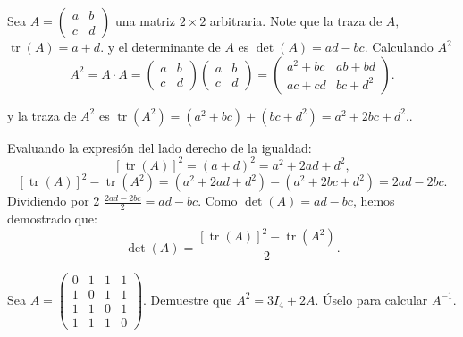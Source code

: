\begin{myproof}
Sea \(A = \begin{pmatrix} a & b \\ c & d \end{pmatrix}\) una matriz \(2 \times 2\) arbitraria. Note que la traza de $A,$ \(
\operatorname{tr}(A) = a + d.
\) y el determinante de $A$ es \(
\det(A) = ad - bc.\) Calculando $A^2$
\[
A^2 = A \cdot A = \begin{pmatrix} a & b \\ c & d \end{pmatrix} \begin{pmatrix} a & b \\ c & d \end{pmatrix} = \begin{pmatrix} a^2 + bc & ab + bd \\ ac + cd & bc + d^2 \end{pmatrix}.
\]

 y la traza de $A^2$ es \(
\operatorname{tr}(A^2) = (a^2 + bc) + (bc + d^2) = a^2 + 2bc + d^2.
.\)

Evaluando la expresión del lado derecho de la igualdad:
\[
[\operatorname{tr}(A)]^2 = (a + d)^2 = a^2 + 2ad + d^2,
\]
\[
[\operatorname{tr}(A)]^2 - \operatorname{tr}(A^2) = (a^2 + 2ad + d^2) - (a^2 + 2bc + d^2) = 2ad - 2bc.
\]
Dividiendo por 2 \(
\frac{2ad - 2bc}{2} = ad - bc.
\) Como $\det(A) = ad - bc$, hemos demostrado que:
\[
\det(A) = \frac{[\operatorname{tr}(A)]^2 - \operatorname{tr}(A^2)}{2}.
\]
\end{myproof}


\begin{prob}
Sea $A=\begin{pmatrix} 0&1&1&1\\1&0&1&1\\1&1&0&1\\1&1&1&0 \end{pmatrix}.$ Demuestre que $A^2=3I_{4}+2A.$ Úselo para calcular $A^{-1}.$
\end{prob}

